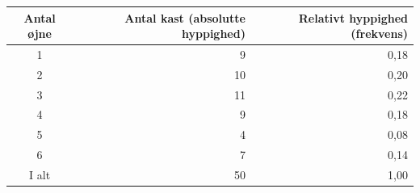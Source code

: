 \documentclass[11pt]{article}
\begin{document}
\begin{table}[H]
\centering
\begin{tabular}{|c | r| r| } \hline
Antal øjne & Antal kast (absolutte hyppighed) & Relativt hyppighed (frekvens)\\ \hline
1          & 9          & 0,18                            \\
2          & 10         & 0,20                            \\
3          & 11         & 0,22                            \\
4          & 9          & 0,18                            \\
5          & 4          & 0,08                            \\
6          & 7          & 0,14                                \\ \hline
I alt      & 50         & 1,00                           \\ \hline
\end{tabular}
\end{table}
\end{document}
